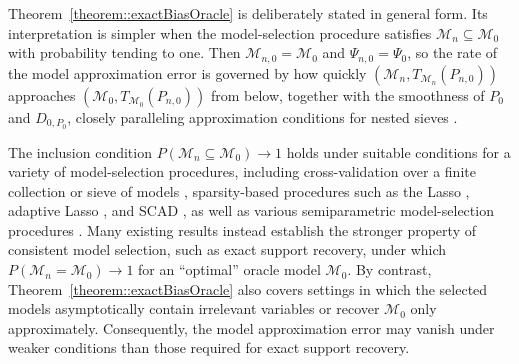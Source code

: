 \documentclass[11pt]{article}
\theoremstyle{definition}
\begin{document}
 
Theorem~\ref{theorem::exactBiasOracle} is deliberately stated in general form. Its interpretation is simpler when the model-selection procedure satisfies \(\mathcal{M}_n \subseteq \mathcal{M}_0\) with probability tending to one. Then \(\mathcal{M}_{n,0} = \mathcal{M}_0\) and \(\Psi_{n,0} = \Psi_0\), so the rate of the model approximation error is governed by how quickly \((\mathcal{M}_n, T_{\mathcal{M}_n}(P_{n,0}))\) approaches \((\mathcal{M}_0, T_{\mathcal{M}_0}(P_{n,0}))\) from below, together with the smoothness of \(P_0\) and \(D_{0,P_0}\), closely paralleling approximation conditions for nested sieves \citep{shen1997methods,spnpsieve,SieveQiu}.

The inclusion condition \(P(\mathcal{M}_n \subseteq \mathcal{M}_0) \to 1\) holds under suitable conditions for a variety of model-selection procedures, including cross-validation over a finite collection or sieve of models \citep{shao1993linear, van2003unified, SieveQiu}, sparsity-based procedures such as the Lasso \citep{Tibshirani94regressionshrinkage}, adaptive Lasso \citep{AdaptLassoOracle}, and SCAD \citep{oracleSelectSCAD}, as well as various semiparametric model-selection procedures \citep{bunea2004consistent, li2008variable, claeskens2007asymptotic, ravikumar2009sparse, huang2010variable, su2014variable, xu2016faithful, amato2022wavelet}. Many existing results instead establish the stronger property of consistent model selection, such as exact support recovery, under which \(P(\mathcal{M}_n = \mathcal{M}_0) \to 1\) for an ``optimal'' oracle model \(\mathcal{M}_0\). By contrast, Theorem~\ref{theorem::exactBiasOracle} also covers settings in which the selected models asymptotically contain irrelevant variables or recover \(\mathcal{M}_0\) only approximately. Consequently, the model approximation error may vanish under weaker conditions than those required for exact support recovery.

 

 
 
 
\end{document}
